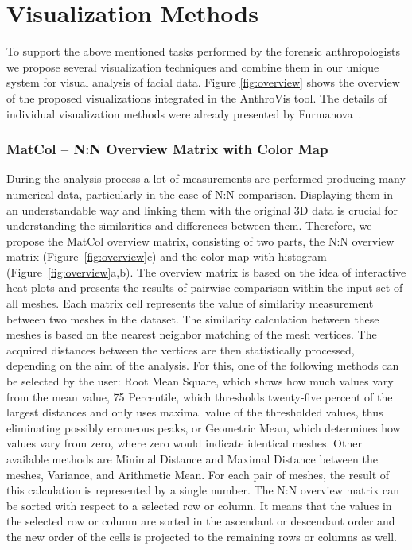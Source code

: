 \documentclass[final,5p,times]{elsarticle}
\begin{document}
\section{Visualization Methods} \label{exface}
To support the above mentioned tasks performed by the forensic anthropologists we propose several visualization techniques and combine them in our unique system for visual analysis of facial data.
Figure \ref{fig:overview} shows the overview of the proposed visualizations integrated in the AnthroVis tool.
The details of individual visualization methods were already presented by Furmanova~\cite{Furmanova2015}.

\subsubsection{MatCol -- N:N Overview Matrix with Color Map}
During the analysis process a lot of measurements are performed producing many numerical data, particularly in the case of N:N comparison.
Displaying them in an understandable way and linking them with the original 3D data is crucial for understanding the similarities and differences between them.
Therefore, we propose the MatCol overview matrix, consisting of two parts, the N:N overview matrix (Figure~\ref{fig:overview}c) and the color map with histogram (Figure~\ref{fig:overview}a,b). 
The overview matrix is based on the idea of interactive heat plots and presents the results of pairwise comparison within the input set of all meshes.
Each matrix cell represents the value of similarity measurement between two meshes in the dataset.
The similarity calculation between these meshes is based on the nearest neighbor matching of the mesh vertices.
The acquired distances between the vertices are then statistically processed, depending on the aim of the analysis.
For this, one of the following methods can be selected by the user: Root Mean Square, which shows how much values vary from the mean value, 75 Percentile, which thresholds twenty-five percent of the largest distances and only uses maximal value of the thresholded values, thus eliminating possibly erroneous peaks, or Geometric Mean, which determines how values vary from zero, where zero would indicate identical meshes. 
Other available methods are Minimal Distance and Maximal Distance between the meshes, Variance, and Arithmetic Mean.
For each pair of meshes, the result of this calculation is represented by a single number.
The N:N overview matrix can be sorted with respect to a selected row or column.
It means that the values in the selected row or column are sorted in the ascendant or descendant order and the new order of the cells is projected to the remaining rows or columns as well.
\end{document}
